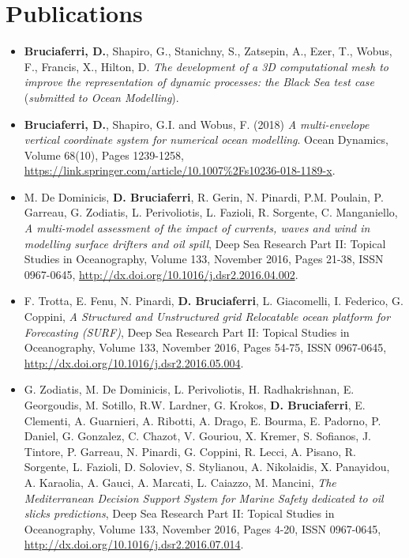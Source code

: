 \documentclass[a4paper, oneside, final]{scrartcl}
\begin{document}
\newpage

\section{Publications}
\noindent
\normalsize

\begin{itemize}
\item \textbf{Bruciaferri, D.}, Shapiro, G., Stanichny, S., Zatsepin, A., Ezer, T., Wobus, F., Francis, X., Hilton, D. \textit{The development of a 3D computational mesh to improve the representation of dynamic processes: the Black Sea test case} (\textit{submitted to Ocean Modelling}).
\item \textbf{Bruciaferri, D.}, Shapiro, G.I. and Wobus, F. (2018) \textit{A multi-envelope vertical coordinate system for numerical ocean modelling}. Ocean Dynamics, Volume 68(10), Pages 1239-1258, \url{https://link.springer.com/article/10.1007\%2Fs10236-018-1189-x}. 
\item M. De Dominicis, \textbf{D. Bruciaferri}, R. Gerin, N. Pinardi, P.M. Poulain, P. Garreau, G. Zodiatis, L. Perivoliotis, L. Fazioli, R. Sorgente, C. Manganiello, \textit{A multi-model assessment of the impact of currents, waves and wind in modelling surface drifters and oil spill}, Deep Sea Research Part II: Topical Studies in Oceanography, Volume 133, November 2016, Pages 21-38, ISSN 0967-0645, \url{http://dx.doi.org/10.1016/j.dsr2.2016.04.002}.\\
\item F. Trotta, E. Fenu, N. Pinardi, \textbf{D. Bruciaferri}, L. Giacomelli, I. Federico, G. Coppini, \textit{A Structured and Unstructured grid Relocatable ocean platform for Forecasting (SURF)}, Deep Sea Research Part II: Topical Studies in Oceanography, Volume 133, November 2016, Pages 54-75, ISSN 0967-0645, \url{http://dx.doi.org/10.1016/j.dsr2.2016.05.004}.
\item G. Zodiatis, M. De Dominicis, L. Perivoliotis, H. Radhakrishnan, E. Georgoudis, M. Sotillo, R.W. Lardner, G. Krokos, \textbf{D. Bruciaferri}, E. Clementi, A. Guarnieri, A. Ribotti, A. Drago, E. Bourma, E. Padorno, P. Daniel, G. Gonzalez, C. Chazot, V. Gouriou, X. Kremer, S. Sofianos, J. Tintore, P. Garreau, N. Pinardi, G. Coppini, R. Lecci, A. Pisano, R. Sorgente, L. Fazioli, D. Soloviev, S. Stylianou, A. Nikolaidis, X. Panayidou, A. Karaolia, A. Gauci, A. Marcati, L. Caiazzo, M. Mancini, \textit{The Mediterranean Decision Support System for Marine Safety dedicated to oil slicks predictions}, Deep Sea Research Part II: Topical Studies in Oceanography, Volume 133, November 2016, Pages 4-20, ISSN 0967-0645, \url{http://dx.doi.org/10.1016/j.dsr2.2016.07.014}.
\end{itemize}
\end{document}
